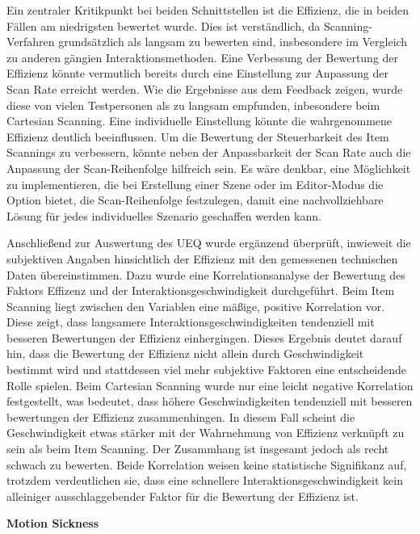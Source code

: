 Ein zentraler Kritikpunkt bei beiden Schnittstellen ist die Effizienz, die in beiden Fällen am niedrigsten bewertet wurde. Dies ist verständlich, da Scanning-Verfahren grundsätzlich als langsam zu bewerten sind, insbesondere im Vergleich zu anderen gängien Interaktionsmethoden. Eine Verbessung der Bewertung der Effizienz könnte vermutlich bereits durch eine Einstellung zur Anpassung der Scan Rate erreicht werden. Wie die Ergebnisse aus dem Feedback zeigen, wurde diese von vielen Testpersonen als zu langsam empfunden, inbesondere beim Cartesian Scanning. Eine individuelle Einstellung könnte die wahrgenommene Effizienz deutlich beeinflussen. 
Um die Bewertung der Steuerbarkeit des Item Scannings zu verbessern, könnte neben der Anpassbarkeit der Scan Rate auch die Anpassung der Scan-Reihenfolge hilfreich sein. Es wäre denkbar, eine Möglichkeit zu implementieren, die bei Erstellung einer Szene oder im Editor-Modus die Option bietet, die Scan-Reihenfolge festzulegen, damit eine nachvollziehbare Lösung für jedes individuelles Szenario geschaffen werden kann. 

Anschließend zur Auswertung des UEQ wurde ergänzend überprüft, inwieweit die subjektiven Angaben hinsichtlich der Effizienz mit den gemessenen technischen Daten übereinstimmen. Dazu wurde eine Korrelationsanalyse der Bewertung des Faktors Effizenz und der Interaktionsgeschwindigkeit durchgeführt. 
Beim Item Scanning liegt zwischen den Variablen eine mäßige, positive Korrelation vor. Diese zeigt, dass langsamere Interaktionsgeschwindigkeiten tendenziell mit besseren Bewertungen der Effizienz einhergingen. Dieses Ergebnis deutet darauf hin, dass die Bewertung der Effizienz nicht allein durch Geschwindigkeit bestimmt wird und stattdessen viel mehr subjektive Faktoren eine entscheidende Rolle spielen.
Beim Cartesian Scanning wurde nur eine leicht negative Korrelation festgestellt, was bedeutet, dass höhere Geschwindigkeiten tendenziell mit besseren bewertungen der Effizienz zusammenhingen. In diesem Fall scheint die Geschwindigkeit etwas stärker mit der Wahrnehmung von Effizienz verknüpft zu sein als beim Item Scanning. Der Zusammhang ist insgesamt jedoch als recht schwach zu bewerten. Beide Korrelation weisen keine statistische Signifikanz auf, trotzdem verdeutlichen sie, dass eine schnellere Interaktionsgeschwindigkeit kein alleiniger ausschlaggebender Faktor für die Bewertung der Effizienz ist.

\textbf{Motion Sickness}

